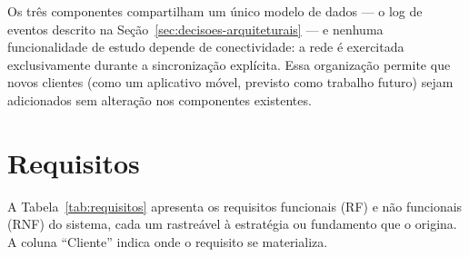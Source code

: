 \documentclass[12pt, %
openright, 
oneside,
a4paper,
english,   %
brazil]{facom-ufu-abntex2}
\begin{document}
Os três componentes compartilham um único modelo de dados --- o log de eventos
descrito na Seção~\ref{sec:decisoes-arquiteturais} --- e nenhuma funcionalidade
de estudo depende de conectividade: a rede é exercitada exclusivamente durante
a sincronização explícita. Essa organização permite que novos clientes (como um
aplicativo móvel, previsto como trabalho futuro) sejam adicionados sem
alteração nos componentes existentes.

\section{Requisitos}
\label{sec:requisitos}

A Tabela~\ref{tab:requisitos} apresenta os requisitos funcionais (RF) e não
funcionais (RNF) do sistema, cada um rastreável à estratégia ou fundamento que
o origina. A coluna ``Cliente'' indica onde o requisito se materializa.
\end{document}
